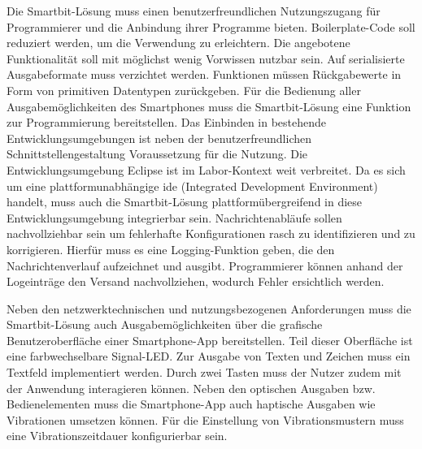 \documentclass[11pt,a4paper]{report}
\begin{document}
Die Smartbit-Lösung muss einen benutzerfreundlichen Nutzungszugang für Programmierer und die Anbindung ihrer Programme bieten.
Boilerplate-Code soll reduziert werden, um die Verwendung zu erleichtern.
Die angebotene Funktionalität soll mit möglichst wenig Vorwissen nutzbar sein.
Auf serialisierte Ausgabeformate muss verzichtet werden.
Funktionen müssen Rückgabewerte in Form von primitiven Datentypen zurückgeben.
Für die Bedienung aller Ausgabemöglichkeiten des Smartphones muss die Smartbit-Lösung eine Funktion zur Programmierung bereitstellen.
Das Einbinden in bestehende Entwicklungsumgebungen ist neben der benutzerfreundlichen Schnittstellengestaltung Voraussetzung für die Nutzung.
Die Entwicklungsumgebung Eclipse ist im Labor-Kontext weit verbreitet.
Da es sich um eine plattformunabhängige \acrshort{ide} (Integrated Development Environment) handelt, muss auch die Smartbit-Lösung plattformübergreifend in diese Entwicklungsumgebung integrierbar sein.
Nachrichtenabläufe sollen nachvollziehbar sein um fehlerhafte Konfigurationen rasch zu identifizieren und zu korrigieren.
Hierfür muss es eine Logging-Funktion geben, die den Nachrichtenverlauf aufzeichnet und ausgibt.
Programmierer können anhand der Logeinträge den Versand nachvollziehen, wodurch Fehler ersichtlich werden.

Neben den netzwerktechnischen und nutzungsbezogenen Anforderungen muss die Smartbit-Lösung auch Ausgabemöglichkeiten über die grafische Benutzeroberfläche einer Smartphone-App bereitstellen.
Teil dieser Oberfläche ist eine farbwechselbare Signal-LED.
Zur Ausgabe von Texten und Zeichen muss ein Textfeld implementiert werden.
Durch zwei Tasten muss der Nutzer zudem mit der Anwendung interagieren können.
Neben den optischen Ausgaben bzw. Bedienelementen muss die Smartphone-App auch haptische Ausgaben wie Vibrationen umsetzen können.
Für die Einstellung von Vibrationsmustern muss eine Vibrationszeitdauer konfigurierbar sein.
\end{document}
